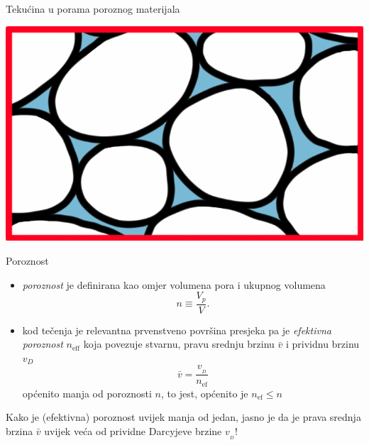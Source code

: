 \documentclass{beamer}
\begin{document}
%
\begin{frame}{Tekućina u porama poroznog materijala}
\begin{center}
\includegraphics[height=0.55\paperheight]{slike/MF-11-tekucina-u-porama} 
\par\end{center}

\end{frame}
%
\begin{frame}{Poroznost}
\begin{itemize}
\item \emph{poroznost} je definirana kao omjer volumena pora i ukupnog volumena
\[
n\equiv\frac{V_{p}}{V}.
\]
\item kod tečenja je relevantna prvenstveno površina presjeka pa je \emph{efektivna
poroznost} $n_{\text{eff}}$ koja povezuje stvarnu, pravu srednju
brzinu $\bar{v}$ i prividnu brzinu $v_{{\scriptscriptstyle D}}$
\[
\bar{v}=\frac{v_{{\scriptscriptstyle _{D}}}}{n_{\text{ef}}}
\]
općenito manja od poroznosti $n$, to jest, općenito je $n_{\text{ef}}\leq n$ 
\end{itemize}
\begin{alertblock}{}
Kako je (efektivna) poroznost uvijek manja od jedan, jasno je da
je prava srednja brzina $\bar{v}$ uvijek veća od prividne Darcyjeve
brzine $v_{{\scriptscriptstyle _{D}}}$! 
\end{alertblock}
\end{frame}
\end{document}
